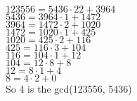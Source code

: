 
$123556 = 5436 \cdot 22 + 3964$ \\
$5436 = 3964 \cdot 1 + 1472$ \\
$3964 = 1472 \cdot 2 + 1020$ \\
$1472 = 1020 \cdot 1 + 425$ \\
$1020 = 425 \cdot 2 + 116$ \\
$425 = 116 \cdot 3 + 104$ \\
$116 = 104 \cdot 1 + 12$ \\
$104 = 12 \cdot 8 + 8$ \\
$12 = 8 \cdot 1 + 4$ \\
$8 = 4 \cdot 2 + 0$ \\

So 4 is the gcd(123556, 5436)
